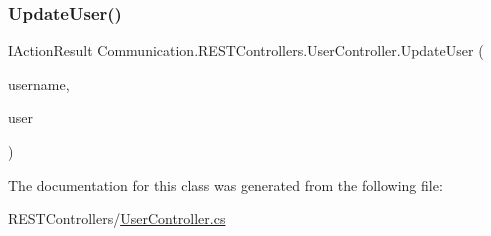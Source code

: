 \mbox{\label{class_communication_1_1_r_e_s_t_controllers_1_1_user_controller_aa97f36ee98608527aed8be3ffe27476f}} 
\subsubsection{\texorpdfstring{Update\+User()}{UpdateUser()}}
{\footnotesize\ttfamily I\+Action\+Result Communication.\+R\+E\+S\+T\+Controllers.\+User\+Controller.\+Update\+User (\begin{DoxyParamCaption}\item[{\mbox{[}\+From\+Header\mbox{]} string}]{username,  }\item[{\mbox{[}\+From\+Body\mbox{]} User}]{user }\end{DoxyParamCaption})}



The documentation for this class was generated from the following file\+:\begin{DoxyCompactItemize}
\item 
R\+E\+S\+T\+Controllers/\mbox{\hyperlink{_user_controller_8cs}{User\+Controller.\+cs}}\end{DoxyCompactItemize}
